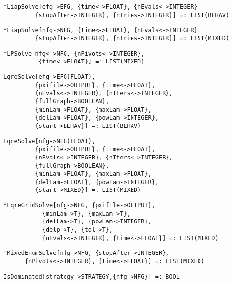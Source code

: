\protect \large \begin{verbatim}
*LiapSolve[efg->EFG, {time<->FLOAT}, {nEvals<->INTEGER},
         {stopAfter->INTEGER}, {nTries->INTEGER}] =: LIST(BEHAV)
\end{verbatim}\normalsize

\protect \large \begin{verbatim}
*LiapSolve[nfg->NFG, {time<->FLOAT}, {nEvals<->INTEGER},
         {stopAfter->INTEGER}, {nTries->INTEGER}] =: LIST(MIXED)
\end{verbatim}\normalsize

\protect \large \begin{verbatim}
*LPSolve[nfg<->NFG, {nPivots<->INTEGER},
          {time<->FLOAT}] =: LIST(MIXED)
\end{verbatim}\normalsize
 
\protect \large \begin{verbatim}
LqreSolve[efg->EFG(FLOAT),
         {pxifile->OUTPUT}, {time<->FLOAT},
         {nEvals<->INTEGER}, {nIters<->INTEGER},
         {fullGraph->BOOLEAN},
         {minLam->FLOAT}, {maxLam->FLOAT}, 
         {delLam->FLOAT}, {powLam->INTEGER}, 
         {start->BEHAV}] =: LIST(BEHAV)
\end{verbatim}\normalsize

\protect \large \begin{verbatim}
LqreSolve[nfg->NFG(FLOAT),
         {pxifile->OUTPUT}, {time<->FLOAT},
         {nEvals<->INTEGER}, {nIters<->INTEGER},
         {fullGraph->BOOLEAN},
         {minLam->FLOAT}, {maxLam->FLOAT}, 
         {delLam->FLOAT}, {powLam->INTEGER}, 
         {start->MIXED}] =: LIST(MIXED)
\end{verbatim}\normalsize

\protect \large \begin{verbatim}
*LqreGridSolve[nfg->NFG, {pxifile->OUTPUT},
           {minLam->T}, {maxLam->T}, 
           {delLam->T}, {powLam->INTEGER}, 
           {delp->T}, {tol->T},
           {nEvals<->INTEGER}, {time<->FLOAT}] =: LIST(MIXED)
\end{verbatim}\normalsize

\protect \large \begin{verbatim}
*MixedEnumSolve[nfg->NFG, {stopAfter->INTEGER},
      {nPivots<->INTEGER}, {time<->FLOAT}] =: LIST(MIXED)
\end{verbatim}\normalsize

\protect \large \begin{verbatim}
IsDominated[strategy->STRATEGY,{nfg->NFG}] =: BOOL
\end{verbatim}\normalsize

